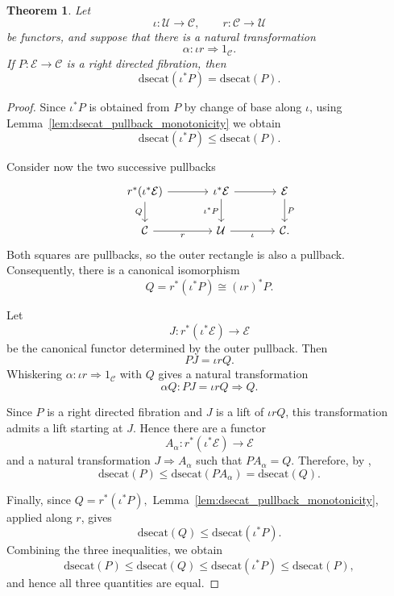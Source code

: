 \documentclass[12pt]{amsart}
\newtheorem{theorem}[teo]{Theorem}
\theoremstyle{definition}
\theoremstyle{remark}
\numberwithin{figure}{section}%
\newcommand{\CC}{\mathcal{C}}
\newcommand{\E}{\mathcal{E}}
\newcommand{\Uc}{\mathcal{U}}
\begin{document}
\begin{theorem}\label{thm:dsecat_directed_fibration_retract}
Let
\[
\iota\colon\Uc\longrightarrow\CC,
\qquad
r\colon\CC\longrightarrow\Uc
\]
be functors, and suppose that there is a natural transformation
\[
\alpha\colon\iota r\Rightarrow1_\CC.
\]
If \(P\colon\E\to\CC\) is a right directed fibration, then
\[
\mathrm{dsecat}(\iota^*P)
=
\mathrm{dsecat}(P).
\]
\end{theorem}

\begin{proof}
Since \(\iota^*P\) is obtained from \(P\) by change of base along
\(\iota\), using Lemma~\ref{lem:dsecat_pullback_monotonicity} we obtain
\[
\mathrm{dsecat}(\iota^*P)
\leq
\mathrm{dsecat}(P).
\]

Consider now the two successive pullbacks
\[
\begin{tikzcd}[column sep=large]
r^*(\iota^*\E)
  \arrow[r]
  \arrow[d, "Q"']
&
\iota^*\E
  \arrow[r]
  \arrow[d, "\iota^*P"']
&
\E
  \arrow[d, "P"]
\\
\CC
  \arrow[r, "r"']
&
\Uc
  \arrow[r, "\iota"']
&
\CC .
\end{tikzcd}
\]
Both squares are pullbacks, so the outer rectangle is also a pullback.
Consequently, there is a canonical isomorphism
\[
Q
=
r^*(\iota^*P)
\cong
(\iota r)^*P.
\]

Let
\[
J\colon r^*(\iota^*\E)\longrightarrow\E
\]
be the canonical functor determined by the outer pullback. Then
\[
PJ=\iota rQ.
\]
Whiskering \(\alpha\colon\iota r\Rightarrow1_\CC\) with \(Q\) gives a
natural transformation
\[
\alpha Q\colon
PJ=\iota rQ
\Rightarrow
Q.
\]

Since \(P\) is a right directed fibration and \(J\) is a lift of
\(\iota rQ\), this transformation admits a lift starting at \(J\).
Hence there are a functor
\[
A_\alpha\colon r^*(\iota^*\E)\longrightarrow\E
\]
and a natural transformation
\(
J\Rightarrow A_\alpha
\)
such that
\(
PA_\alpha=Q.
\)
Therefore, by \cite[Proposition~6.3]{DirectedHomotopyDatabases},
\[
\mathrm{dsecat}(P)
\leq
\mathrm{dsecat}(PA_\alpha)
=
\mathrm{dsecat}(Q).
\]

Finally, since
\(
Q=r^*(\iota^*P),
\)
Lemma~\ref{lem:dsecat_pullback_monotonicity}, applied along \(r\), gives
\[
\mathrm{dsecat}(Q)
\leq
\mathrm{dsecat}(\iota^*P).
\]
Combining the three inequalities, we obtain
\[
\mathrm{dsecat}(P)
\leq
\mathrm{dsecat}(Q)
\leq
\mathrm{dsecat}(\iota^*P)
\leq
\mathrm{dsecat}(P),
\]
and hence all three quantities are equal.
\end{proof}
\end{document}
